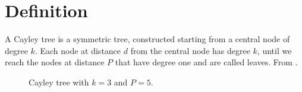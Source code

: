 \section{Definition}

    A Cayley tree is a symmetric tree, constructed starting from a central node of degree $k$. Each node at distance $d$ from the central node has degree $k$, until we reach the nodes at distance $P$ that have degree one and are called leaves. From \cite{barabasi}.

    \begin{figure}[H]
        \centering
        

        \caption{Cayley tree with $k = 3$ and $P = 5$.}
    \end{figure}
